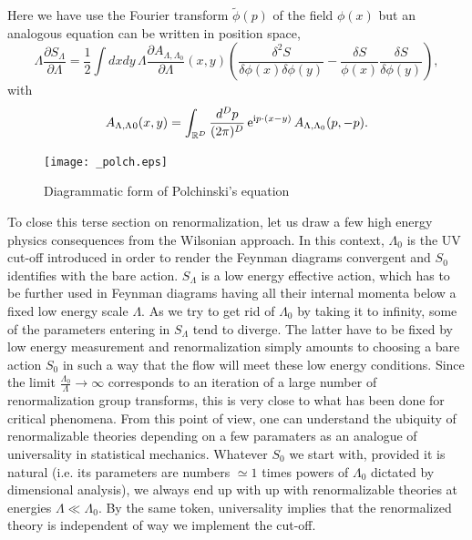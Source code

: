 \documentclass[10pt,here,feynmf]{article}
\begin{document}
Here we have use the Fourier transform $\widetilde{\phi}(p)$ of the field $\phi(x)$ but an analogous equation can be written in position space,
\begin{equation}
\Lambda\frac{\partial
S_{\Lambda}}{\partial\Lambda}=\frac{1}{2}\int\!dxdy\,
\Lambda\frac{\partial
A_{\Lambda,\Lambda_{0}}}{\partial\Lambda}(x,y)
\left(
\frac{\delta^{2}S}{\delta\phi(x)\delta\phi(y)}- 
\frac{\delta S}{\phi(x)}\frac{\delta S}{\delta\phi(y)}\right),
\end{equation}
with 
\begin{equation}
A_{\Lambda,\Lambda_{}0}(x,y)=\int_{{\Bbb R}^{D}}\frac{d^{D}p}{(2\pi)^{D}}\,
\mathrm{e}^{\mathrm{i}p\cdot(x-y)}\,A_{\Lambda,\Lambda_{0}}(p,-p).
\end{equation}


\begin{figure}
\begin{center}
\texttt{[image: \_polch.eps]}
\caption{Diagrammatic form of Polchinski's equation}
\label{Polchinskidiag}
\end{center}
\end{figure}

To close this terse section on renormalization, let us draw a few high energy physics consequences from the Wilsonian approach. In this context, $\Lambda_{0}$ is the UV cut-off introduced in order to render the Feynman diagrams convergent and $S_{0}$ identifies with the bare action. $S_{\Lambda}$ is a low energy effective action, which has to be further used in Feynman diagrams having all their internal momenta below a fixed low energy scale $\Lambda$. As we try to get rid of $\Lambda_{0}$ by taking it to infinity, some of the parameters entering in $S_{\Lambda}$ tend to diverge. The latter have to be fixed by low energy measurement and renormalization simply amounts to choosing a bare action $S_{0}$ in such a way that the flow will meet these low energy conditions. Since the limit $\frac{\Lambda_{0}}{\Lambda}\rightarrow\infty$ corresponds to an iteration of a large number of renormalization group transforms, this is very close to what has been done for critical phenomena. From this point of view, one can understand the ubiquity of renormalizable theories depending on a few paramaters as an analogue of universality in statistical mechanics. Whatever $S_{0}$ we start with, provided it is natural (i.e. its parameters are numbers $\simeq 1$ times powers of $\Lambda_{0}$ dictated by dimensional analysis), we always end up with up with renormalizable theories at energies $\Lambda\ll \Lambda_{0}$.  By the same token, universality implies that the renormalized theory is independent of way we implement the cut-off.  
\end{document}
